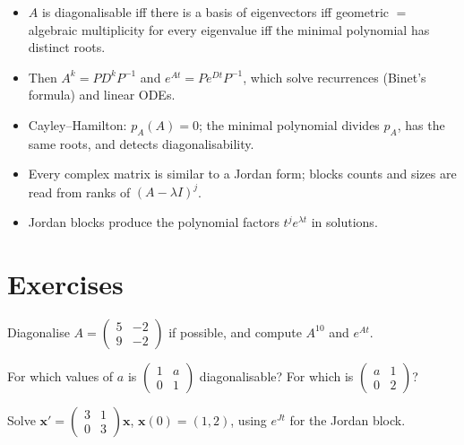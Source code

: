\begin{summarybox}
\begin{itemize}
  \item $A$ is diagonalisable iff there is a basis of eigenvectors iff geometric $=$ algebraic multiplicity for every eigenvalue iff the minimal polynomial has distinct roots.
  \item Then $A^k=PD^kP^{-1}$ and $e^{At}=Pe^{Dt}P^{-1}$, which solve recurrences (Binet's formula) and linear ODEs.
  \item Cayley--Hamilton: $p_A(A)=0$; the minimal polynomial divides $p_A$, has the same roots, and detects diagonalisability.
  \item Every complex matrix is similar to a Jordan form; blocks counts and sizes are read from ranks of $(A-\lambda I)^j$.
  \item Jordan blocks produce the polynomial factors $t^je^{\lambda t}$ in solutions.
\end{itemize}
\end{summarybox}

\section{Exercises}

\begin{exercise}
Diagonalise $A=\begin{pmatrix}5&-2\\9&-2\end{pmatrix}$ if possible, and compute $A^{10}$ and $e^{At}$.
\end{exercise}

\begin{exercise}
For which values of $a$ is $\begin{pmatrix}1&a\\0&1\end{pmatrix}$ diagonalisable? For which is $\begin{pmatrix}a&1\\0&2\end{pmatrix}$?
\end{exercise}

\begin{exercise}
Solve $\mathbf{x}'=\begin{pmatrix}3&1\\0&3\end{pmatrix}\mathbf{x}$, $\mathbf{x}(0)=(1,2)$, using $e^{Jt}$ for the Jordan block.
\end{exercise}

